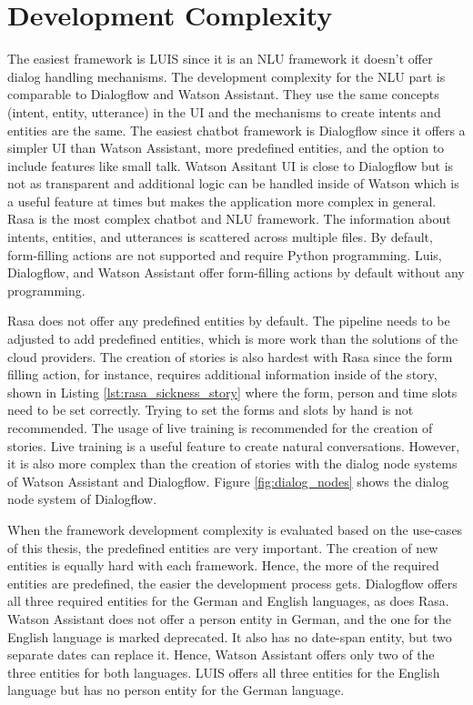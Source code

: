 \section*{Development Complexity}
The easiest framework is LUIS since it is an NLU framework it doesn't
offer dialog handling mechanisms.
The development complexity for the NLU part is comparable to Dialogflow and Watson Assistant.
They use the same concepts (intent, entity, utterance) in the UI and the 
mechanisms to create intents and entities are the same.
The easiest chatbot framework is Dialogflow since it offers a simpler UI than Watson Assistant, more predefined entities, and the option to 
include features like small talk.
Watson Assitant UI is close to Dialogflow but is not as transparent 
and additional logic can be handled inside of Watson which is a
useful feature at times but makes the application more complex in general.
Rasa is the most complex chatbot and NLU framework.
The information about intents, entities, and utterances is scattered across multiple files.
By default, form-filling actions are not supported and require Python programming.
Luis, Dialogflow, and Watson Assistant offer form-filling actions by default without any programming.

Rasa does not offer any predefined entities by default.
The pipeline needs to be adjusted to add predefined entities, which is more work than the solutions of the cloud providers.
The creation of stories is also hardest with Rasa since the form filling action, for instance, requires additional information inside of the story, shown in Listing \ref{lst:rasa_sickness_story} where the form, person and time slots need to be set correctly.
Trying to set the forms and slots by hand is not recommended.
The usage of live training is recommended for the creation of stories.
Live training is a useful feature to create natural conversations. However, it is also more complex than the creation of stories with the dialog node systems of Watson Assistant and Dialogflow.
Figure \ref{fig:dialog_nodes} shows the dialog node system of Dialogflow.

When the framework development complexity is evaluated based on the use-cases of this thesis, the predefined entities are very important.
The creation of new entities is equally hard with each framework.
Hence, the more of the required entities are predefined, the easier the development process gets.
Dialogflow offers all three required entities for the German and English languages, as does Rasa.
Watson Assistant does not offer a person entity in German, and the one for the English language is marked deprecated.
It also has no date-span entity, but two separate dates can replace it.
Hence, Watson Assistant offers only two of the three entities for both languages. 
LUIS offers all three entities for the English language but has no person entity for the German language. 

